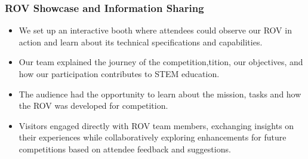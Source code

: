\documentclass[11pt, twocolumn]{article}
\begin{document}
\subsubsection{ROV Showcase and Information Sharing}
\begin{itemize}
    \item We set up an interactive booth where attendees could observe our ROV in action and learn about its technical specifications and capabilities.
    \item Our team explained the journey of the competition,tition, our objectives, and how our participation contributes to STEM education.
    \item The audience had the opportunity to learn about the mission, tasks and how the ROV was developed for competition.
    \item Visitors engaged directly with ROV team members, exchanging insights on their experiences while collaboratively exploring enhancements for future competitions based on attendee feedback and suggestions.
\end{itemize}
\end{document}
